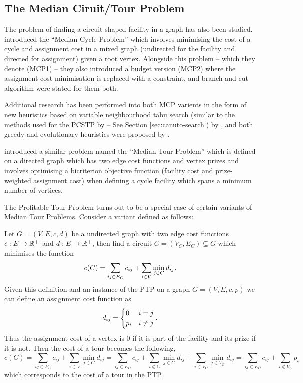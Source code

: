  \subsection{The Median Ciruit/Tour Problem}
 The problem of finding a circuit shaped facility in a graph has also been studied.
 \citet{labbe1999themedian} introduced the ``Median Cycle Problem'' which involves
 minimising the cost of a cycle and assignment cost in a mixed graph (undirected for
 the facility and directed for assignment) given a root vertex. Alongside this problem
 -- which they denote (MCP1) -- they also introduced a budget version (MCP2) where the
 assignment cost minimisation is replaced with a constraint, and branch-and-cut algorithm
 were stated for them both.

 Additional research has been performed into both MCP varients
 in the form of new heuristics based on variable neighbourhood tabu search
 (similar to the methods used for the PCSTP by \citet{canuto2001local} --
 See Section \ref{sec:canuto-search}) by \citet{perez2003variable}, and both
 greedy and evolutionary heuristics were proposed by \citet{renaud2004efficient}.
 
 \citet{current1994median} introduced a similar problem named the ``Median Tour Problem''
 which is defined on a directed graph which has two edge cost functions and vertex prizes
 and involves optimising a bicriterion objective function
 (facility cost and prize-weighted assignment cost)
 when defining a cycle facility which spans a minimum number of vertices.

 The Profitable Tour Problem turns out to be a special case of certain variants of Median
 Tour Problems. Consider a variant defined as follows:

 Let $G = (V, E, c, d)$ be a undirected graph with two edge cost functions
 $c : E \to \mathbb{R}^+$ and $d : E \to \mathbb{R}^+$, then find a circuit $C = (V_C, E_C) \subseteq G$
 which minimises
 the function
 $$c(C) = \sum_{ij \in E_C} c_{ij} + \sum_{i \in V} \min_{j \in C} d_{ij} \mathnormal{.}$$
 Given this definition and an instance of the PTP on a graph $G = (V, E, c, p)$
 we can define an assignment cost function as
 $$d_{ij} =
 \begin{cases}
   0 & i = j \\
   p_i & i \neq j
 \end{cases}\mathnormal{.}
 $$
 Thus the assignment cost of a vertex is 0 if it is part of the facility and its prize
 if it is not. Then the cost of a tour becomes the following,
 $$c(C) = \sum_{ij \in E_C} c_{ij} + \sum_{i \in V} \min_{j \in C} d_{ij} =
 \sum_{ij \in E_C} c_{ij} + \sum_{i \not\in C} \min_{j \in C} d_{ij} + \sum_{i \in V_C} \min_{j \in V_C} d_{ij}
 = \sum_{ij \in E_C} c_{ij} + \sum_{i \not\in V_C}  p_i$$
 which corresponds to the cost of a tour in the PTP.

